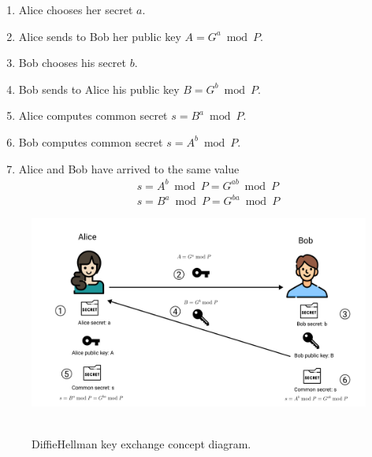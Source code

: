 \begin{enumerate}
    \item Alice chooses her secret $a$.
    \item Alice sends to Bob her public key $A = G^a \bmod P$.
    \item Bob chooses his secret $b$.
    \item Bob sends to Alice his public key $B = G^b \bmod P$.
    \item Alice computes common secret $s = B^a \bmod P$.
    \item Bob computes common secret $s = A^b \bmod P$.
    \item Alice and Bob have arrived to the same value
    \begin{align}
        s = A^b \bmod P = G^{ab} \bmod P \\
        s = B^a \bmod P = G^{ba} \bmod P
    \end{align}
\end{enumerate}

\begin{figure}[H]
    \centering
    \includegraphics[width=1\textwidth]{Pictures/DH_Key_Exchange}
    ~\caption{Diffie\textendash Hellman key exchange concept diagram.}\label{fig:figure}
\end{figure}